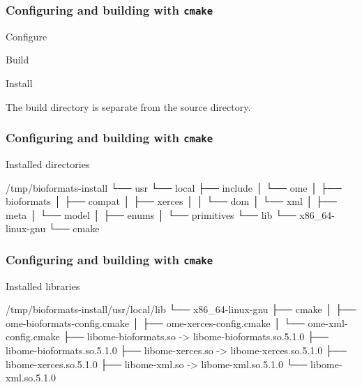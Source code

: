 \begin{frame}[fragile]
  \frametitle{Configuring and building with \texttt{cmake}}
\begin{block}{Configure}
  \begin{semiverbatim}\footnotesize
\end{semiverbatim}
\end{block}
\begin{block}{Build}
  \begin{semiverbatim}\footnotesize
\end{semiverbatim}
\end{block}
\begin{block}{Install}
  \begin{semiverbatim}\footnotesize
\end{semiverbatim}
\end{block}
The build directory is separate from the source directory.
\end{frame}

\begin{frame}[fragile]
  \frametitle{Configuring and building with \texttt{cmake}}
\begin{block}{Installed directories}
  \begin{semiverbatim}\tiny
/tmp/bioformats-install
└── usr
    └── local
        ├── include
        │   └── ome
        │       ├── bioformats
        │       ├── compat
        │       ├── xerces
        │       │   └── dom
        │       └── xml
        │           ├── meta
        │           └── model
        │               ├── enums
        │               └── primitives
        └── lib
            └── x86_64-linux-gnu
                └── cmake
\end{semiverbatim}
\end{block}
\end{frame}

\begin{frame}[fragile]
  \frametitle{Configuring and building with \texttt{cmake}}
\begin{block}{Installed libraries}
  \begin{semiverbatim}\scriptsize
/tmp/bioformats-install/usr/local/lib
└── x86_64-linux-gnu
    ├── cmake
    │   ├── ome-bioformats-config.cmake
    │   ├── ome-xerces-config.cmake
    │   └── ome-xml-config.cmake
    ├── libome-bioformats.so -> libome-bioformats.so.5.1.0
    ├── libome-bioformats.so.5.1.0
    ├── libome-xerces.so -> libome-xerces.so.5.1.0
    ├── libome-xerces.so.5.1.0
    ├── libome-xml.so -> libome-xml.so.5.1.0
    └── libome-xml.so.5.1.0
\end{semiverbatim}
\end{block}
\end{frame}

